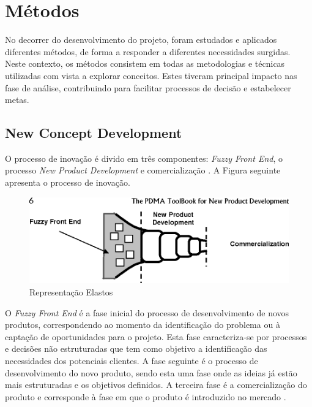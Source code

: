 \section{Métodos}
No decorrer do desenvolvimento do projeto, foram estudados e aplicados diferentes métodos, de forma a responder a diferentes necessidades surgidas. Neste contexto, os métodos consistem em todas as metodologias e técnicas utilizadas com vista a explorar conceitos. Estes tiveram principal impacto nas fase de análise, contribuindo para facilitar processos de decisão e estabelecer metas.

\subsection{New Concept Development}
O processo de inovação é divido em três componentes: \emph{Fuzzy
Front End}, o processo \emph{New Product Development} e comercialização \cite{fuzzy_frontend}. A Figura seguinte
apresenta o processo de inovação.

\begin{figure}[H]
    \begin{center}
    \includegraphics[width=1\textwidth]{figures/new_product_development.png}
    \caption{Representação Elastos}
    \end{center}
\end{figure}

O \emph{Fuzzy Front End} é a fase inicial do processo de desenvolvimento de novos produtos, correspondendo ao momento da identificação do problema ou à captação de oportunidades para o
projeto. Esta fase caracteriza-se por processos e decisões não estruturadas que tem como objetivo a identificação das necessidades dos potenciais clientes. A fase seguinte é o processo de  desenvolvimento do novo produto, sendo esta uma fase onde as ideias já estão mais estruturadas e os objetivos definidos. A terceira fase é a comercialização
do produto e corresponde à fase em que o produto é introduzido no mercado \cite{fuzzy_frontend}.


